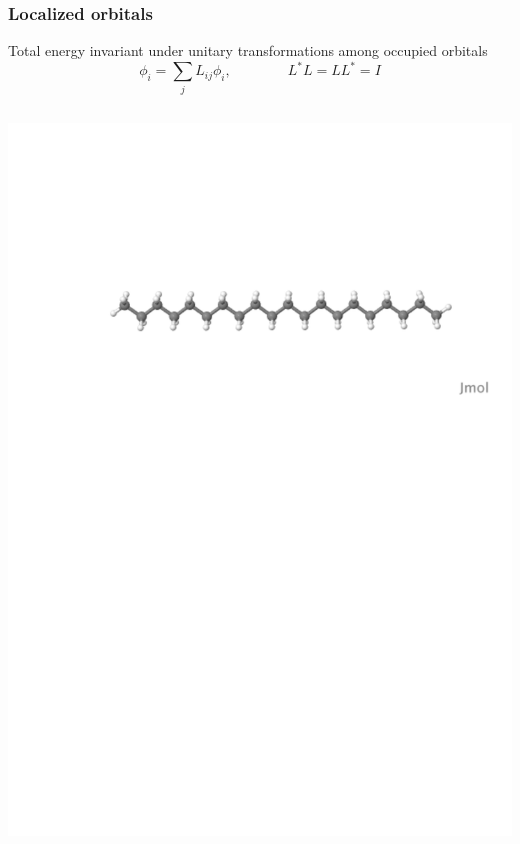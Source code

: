 \documentclass[mathserif, 10pt]{beamer}
\begin{document}
\begin{frame}
    \frametitle{Localized orbitals}
    \centering
    Total energy invariant under unitary transformations among occupied orbitals
    \begin{equation}
	\nonumber
	\phi_i = \sum_j L_{ij} \phi_i, \qquad \qquad L^\ast L = LL^\ast = I
    \end{equation}

    \begin{columns}
    \begin{column}[b]{0.48\linewidth}
    \centering
    \includegraphics[scale=0.25, clip, viewport = 80 560 600 700]{figures/alkane.pdf}\\

\end{column}
\end{columns}
\end{frame}
\end{document}
